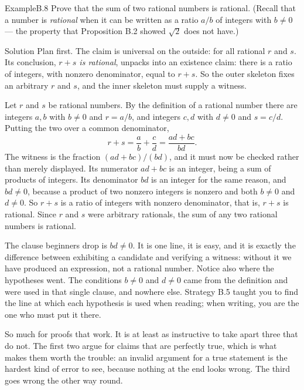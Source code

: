 \documentclass[a4paper,12pt,oneside]{memoir}
\begin{document}
\begin{workedexample}
\begin{envexample}{Example}{B.8}{}
Prove that the sum of two rational numbers is rational. (Recall that a number is \emph{rational} when it can be written as a ratio \(a/b\) of integers with \(b \neq 0\) — the property that Proposition B.2 showed \(\sqrt{2}\) does not have.)
\end{envexample}
\begin{envsolution}{Solution}{}{}
Plan first. The claim is universal on the outside: for all rational \(r\) and \(s\). Its conclusion, \emph{\(r + s\) is rational}, unpacks into an existence claim: there is a ratio of integers, with nonzero denominator, equal to \(r + s\). So the outer skeleton fixes an arbitrary \(r\) and \(s\), and the inner skeleton must supply a witness.

Let \(r\) and \(s\) be rational numbers. By the definition of a rational number there are integers \(a, b\) with \(b \neq 0\) and \(r = a/b\), and integers \(c, d\) with \(d \neq 0\) and \(s = c/d\). Putting the two over a common denominator, \[ r + s = \frac{a}{b} + \frac{c}{d} = \frac{ad + bc}{bd}. \] The witness is the fraction \((ad + bc)/(bd)\), and it must now be checked rather than merely displayed. Its numerator \(ad + bc\) is an integer, being a sum of products of integers. Its denominator \(bd\) is an integer for the same reason, and \(bd \neq 0\), because a product of two nonzero integers is nonzero and both \(b \neq 0\) and \(d \neq 0\). So \(r + s\) is a ratio of integers with nonzero denominator, that is, \(r + s\) is rational. Since \(r\) and \(s\) were arbitrary rationals, the sum of any two rational numbers is rational.

The clause beginners drop is \(bd \neq 0\). It is one line, it is easy, and it is exactly the difference between exhibiting a candidate and verifying a witness: without it we have produced an expression, not a rational number. Notice also where the hypotheses went. The conditions \(b \neq 0\) and \(d \neq 0\) came from the definition and were used in that single clause, and nowhere else. Strategy B.5 taught you to find the line at which each hypothesis is used when reading; when writing, you are the one who must put it there.
\end{envsolution}
\end{workedexample}
So much for proofs that work. It is at least as instructive to take apart three that do not. The first two argue for claims that are perfectly true, which is what makes them worth the trouble: an invalid argument for a true statement is the hardest kind of error to see, because nothing at the end looks wrong. The third goes wrong the other way round.
\end{document}
